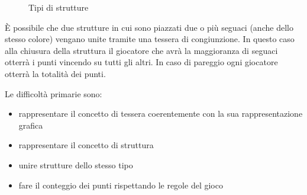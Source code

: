 \begin{figure}[hb]
    \hfill
    \hfill
    \caption{Tipi di strutture}
\end{figure}

È possibile che due strutture in cui sono piazzati due o più seguaci (anche dello stesso colore) vengano unite tramite una tessera di congiunzione. In questo caso alla chiusura della struttura il giocatore che avrà la maggioranza di seguaci otterrà i punti vincendo su tutti gli altri. In caso di pareggio ogni giocatore otterrà la totalità dei punti.

Le difficoltà primarie sono:
\begin{itemize}
    \item rappresentare il concetto di tessera coerentemente con la sua rappresentazione grafica
    \item rappresentare il concetto di struttura
    \item unire strutture dello stesso tipo
    \item fare il conteggio dei punti rispettando le regole del gioco
\end{itemize}

